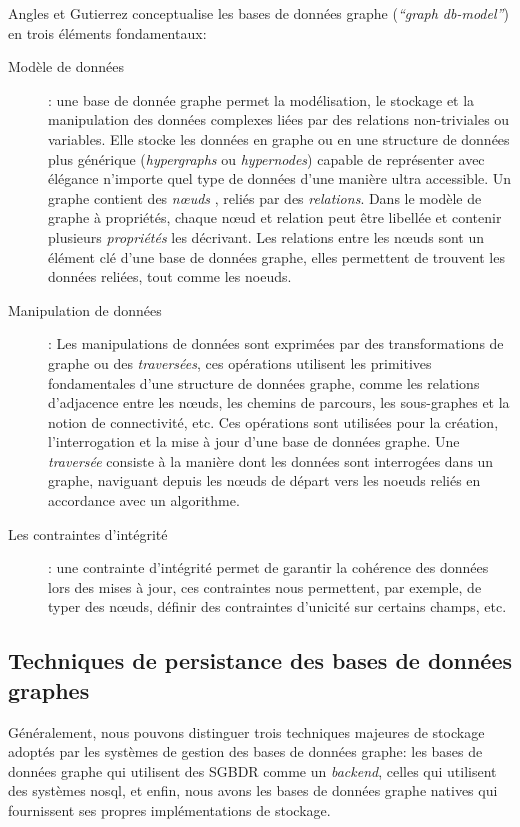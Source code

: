   Angles et Gutierrez \cite{angles2008survey} conceptualise les
  bases de données graphe (\textit{``graph db-model''}) en trois
  éléments fondamentaux:\medskip
  \newpage
  \renewcommand{\descriptionlabel}[1]{\hspace{1cm}\textbullet~\textsf{#1}}
  \begin{description}
  \item [Modèle de données]: une base de donnée graphe permet la
    modélisation, le stockage et la manipulation des données complexes
    liées par des relations non-triviales ou variables. Elle stocke
    les données en graphe ou en une structure de données plus générique
    (\textit{hypergraphs} ou \textit{hypernodes}) capable de
    représenter avec élégance n'importe quel type de données d'une
    manière ultra accessible. Un graphe contient des \textit{nœuds} ,
    reliés par des \textit{relations}. Dans le modèle de graphe à
    propriétés, chaque nœud et relation peut être libellée et contenir
    plusieurs \textit{propriétés} les décrivant. Les relations entre
    les nœuds sont un élément clé d'une base de données graphe, elles
    permettent de trouvent les données reliées, tout comme les
    noeuds.\medskip

  \item [Manipulation de données]: Les manipulations de données sont
    exprimées par des transformations de graphe ou des
    \textit{traversées}, ces opérations utilisent les primitives
    fondamentales d'une structure de données graphe, comme les
    relations d'adjacence entre les nœuds, les chemins de parcours,
    les sous-graphes et  la notion de connectivité, etc. Ces opérations
    sont utilisées pour la création, l'interrogation et la mise à jour
    d'une base de données graphe. Une \textit{traversée} consiste à
    la manière dont les données sont interrogées dans un graphe,
    naviguant depuis les nœuds de départ vers les noeuds reliés en
    accordance avec un algorithme.\medskip

  \item [Les contraintes d'intégrité]: une contrainte d'intégrité
    permet de garantir la cohérence des données lors des mises à jour,
    ces contraintes nous permettent, par exemple, de typer des nœuds,
    définir des contraintes d'unicité sur certains champs, etc.
  \end{description}
\enddescription

  \subsection{Techniques de persistance des bases de données graphes}
  \label{sec:persistence}
  Généralement, nous pouvons distinguer trois techniques majeures de
  stockage adoptés par les systèmes de gestion des bases de données
  graphe: les bases de données graphe qui utilisent des
  \acrshort{SGBDR} comme un \emph{backend}, celles qui utilisent des
  systèmes \acrshort{nosql}, et enfin, nous avons les bases de données
  graphe natives qui fournissent ses propres implémentations de
  stockage.

